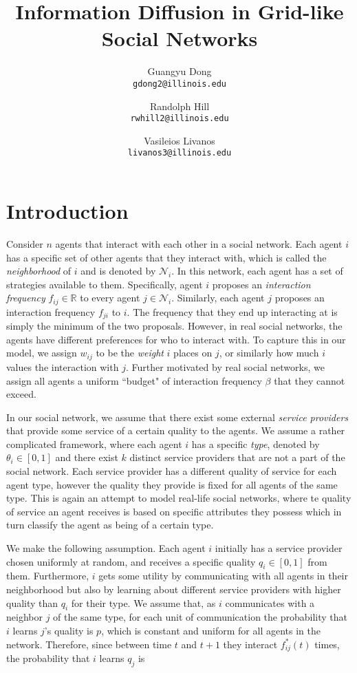 \documentclass[A4paper,11pt]{article}
\author{
	{\sc Guangyu Dong} \\
	\texttt{gdong2@illinois.edu}
	\and
	{\sc Randolph Hill} \\
	\texttt{rwhill2@illinois.edu}
	\and
	{\sc Vasileios Livanos} \\
	\texttt{livanos3@illinois.edu}
}
\title{
Information Diffusion in Grid-like Social Networks
}
\date{}
\begin{document}
 \maketitle

\section{Introduction}

\par Consider $n$ agents that interact with each other in a social network. Each agent $i$ has a specific set of other agents
that they interact with, which is called the \textit{neighborhood} of $i$ and is denoted by $\mathcal{N}_i$. In this network,
each agent has a set of strategies available to them. Specifically, agent $i$ proposes an \textit{interaction frequency}
$f_{ij} \in \mathbb{R}$ to every agent $j \in \mathcal{N}_i$. Similarly, each agent $j$ proposes an
interaction frequency $f_{ji}$ to $i$. The frequency that they end up interacting at is simply the minimum of the two
proposals. However, in real social networks, the agents have different preferences for who to interact with. To capture this
in our model, we assign $w_{ij}$ to be the \textit{weight} $i$ places on $j$, or similarly how much $i$ values the interaction
with $j$. Further motivated by real social networks, we assign all agents a uniform ``budget" of interaction frequency $\beta$
that they cannot exceed.

\par In our social network, we assume that there exist some external \textit{service providers} that provide some service of a
certain quality to the agents. We assume a rather complicated framework, where each agent $i$ has a specific \textit{type},
denoted by $\theta_i \in [0, 1]$ and there exist $k$ distinct service providers that are not a part of the social network. Each
service provider has a different quality of service for each agent type, however the quality they provide is fixed for all agents
of the same type. This is again an attempt to model real-life social networks, where te quality of service an agent receives
is based on specific attributes they possess which in turn classify the agent as being of a certain type.

\par We make the following assumption. Each agent $i$ initially has a service provider chosen uniformly at random, and receives a
specific quality $q_i \in [0, 1]$ from them. Furthermore, $i$ gets some utility by communicating with all agents in their
neighborhood but also by learning about different service providers with higher quality than $q_i$ for their type. We assume
that, as $i$ communicates with a neighbor $j$ of the same type, for each unit of communication the probability that $i$ learns
$j$'s quality is $p$, which is constant and uniform for all agents in the network. Therefore, since between time $t$ and $t+1$
they interact $f^*_{ij}(t)$ times, the probability that $i$ learns $q_j$ is
\end{document}
